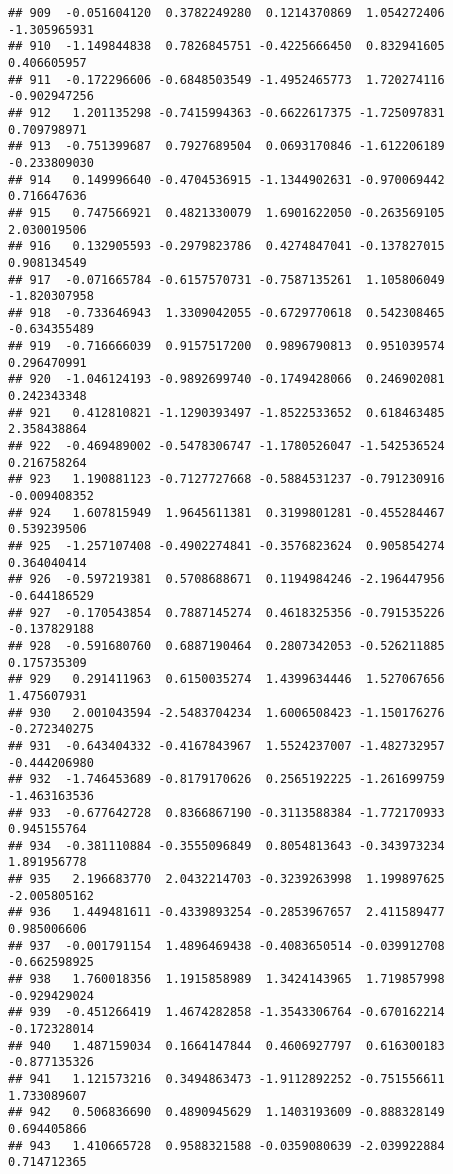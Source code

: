 \documentclass[
]{article}
\begin{document}
\begin{verbatim}
## 909  -0.051604120  0.3782249280  0.1214370869  1.054272406 -1.305965931
## 910  -1.149844838  0.7826845751 -0.4225666450  0.832941605  0.406605957
## 911  -0.172296606 -0.6848503549 -1.4952465773  1.720274116 -0.902947256
## 912   1.201135298 -0.7415994363 -0.6622617375 -1.725097831  0.709798971
## 913  -0.751399687  0.7927689504  0.0693170846 -1.612206189 -0.233809030
## 914   0.149996640 -0.4704536915 -1.1344902631 -0.970069442  0.716647636
## 915   0.747566921  0.4821330079  1.6901622050 -0.263569105  2.030019506
## 916   0.132905593 -0.2979823786  0.4274847041 -0.137827015  0.908134549
## 917  -0.071665784 -0.6157570731 -0.7587135261  1.105806049 -1.820307958
## 918  -0.733646943  1.3309042055 -0.6729770618  0.542308465 -0.634355489
## 919  -0.716666039  0.9157517200  0.9896790813  0.951039574  0.296470991
## 920  -1.046124193 -0.9892699740 -0.1749428066  0.246902081  0.242343348
## 921   0.412810821 -1.1290393497 -1.8522533652  0.618463485  2.358438864
## 922  -0.469489002 -0.5478306747 -1.1780526047 -1.542536524  0.216758264
## 923   1.190881123 -0.7127727668 -0.5884531237 -0.791230916 -0.009408352
## 924   1.607815949  1.9645611381  0.3199801281 -0.455284467  0.539239506
## 925  -1.257107408 -0.4902274841 -0.3576823624  0.905854274  0.364040414
## 926  -0.597219381  0.5708688671  0.1194984246 -2.196447956 -0.644186529
## 927  -0.170543854  0.7887145274  0.4618325356 -0.791535226 -0.137829188
## 928  -0.591680760  0.6887190464  0.2807342053 -0.526211885  0.175735309
## 929   0.291411963  0.6150035274  1.4399634446  1.527067656  1.475607931
## 930   2.001043594 -2.5483704234  1.6006508423 -1.150176276 -0.272340275
## 931  -0.643404332 -0.4167843967  1.5524237007 -1.482732957 -0.444206980
## 932  -1.746453689 -0.8179170626  0.2565192225 -1.261699759 -1.463163536
## 933  -0.677642728  0.8366867190 -0.3113588384 -1.772170933  0.945155764
## 934  -0.381110884 -0.3555096849  0.8054813643 -0.343973234  1.891956778
## 935   2.196683770  2.0432214703 -0.3239263998  1.199897625 -2.005805162
## 936   1.449481611 -0.4339893254 -0.2853967657  2.411589477  0.985006606
## 937  -0.001791154  1.4896469438 -0.4083650514 -0.039912708 -0.662598925
## 938   1.760018356  1.1915858989  1.3424143965  1.719857998 -0.929429024
## 939  -0.451266419  1.4674282858 -1.3543306764 -0.670162214 -0.172328014
## 940   1.487159034  0.1664147844  0.4606927797  0.616300183 -0.877135326
## 941   1.121573216  0.3494863473 -1.9112892252 -0.751556611  1.733089607
## 942   0.506836690  0.4890945629  1.1403193609 -0.888328149  0.694405866
## 943   1.410665728  0.9588321588 -0.0359080639 -2.039922884  0.714712365

\end{verbatim}
\end{document}
